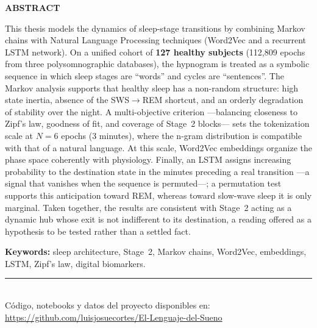 \documentclass[chico, unlado, openany]{recursos/tesis_fc}
\begin{document}
{\newpage
\thispagestyle{empty}
\begin{center}
{\Large\bfseries\MakeUppercase{Abstract}}
\vskip 20pt
{\bfseries\eltitulo}
\vskip 9pt
\elnombre
\end{center}
\vskip 20pt
\noindent This thesis models the dynamics of sleep-stage transitions by combining Markov chains with Natural Language Processing techniques (Word2Vec and a recurrent LSTM network). On a unified cohort of \textbf{127 healthy subjects} (112,809 epochs from three polysomnographic databases), the hypnogram is treated as a symbolic sequence in which sleep stages are ``words'' and cycles are ``sentences''. The Markov analysis supports that healthy sleep has a non-random structure: high state inertia, absence of the SWS$\rightarrow$REM shortcut, and an orderly degradation of stability over the night. A multi-objective criterion ---balancing closeness to Zipf's law, goodness of fit, and coverage of Stage~2 blocks--- sets the tokenization scale at $N=6$ epochs (3 minutes), where the n-gram distribution is compatible with that of a natural language. At this scale, Word2Vec embeddings organize the phase space coherently with physiology. Finally, an LSTM assigns increasing probability to the destination state in the minutes preceding a real transition ---a signal that vanishes when the sequence is permuted---; a permutation test supports this anticipation toward REM, whereas toward slow-wave sleep it is only marginal. Taken together, the results are consistent with Stage~2 acting as a dynamic hub whose exit is not indifferent to its destination, a reading offered as a hypothesis to be tested rather than a settled fact.

\vspace{10pt}
\noindent \textbf{Keywords:} sleep architecture, Stage~2, Markov chains, Word2Vec, embeddings, LSTM, Zipf's law, digital biomarkers.

\vspace{18pt}
\noindent\rule{0.35\linewidth}{0.4pt}\\[2pt]
{\footnotesize Código, notebooks y datos del proyecto disponibles en: \url{https://github.com/luisjosuecortes/El-Lenguaje-del-Sueno}}
}

\frontmatter
\maketitle
\end{document}
